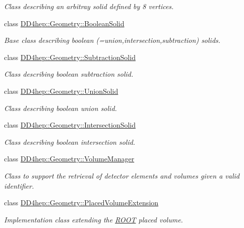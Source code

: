 \begin{DoxyCompactItemize}
\begin{DoxyCompactList}\small\item\em Class describing an arbitray solid defined by 8 vertices. \item\end{DoxyCompactList}\item 
class \hyperlink{class_d_d4hep_1_1_geometry_1_1_boolean_solid}{DD4hep::Geometry::BooleanSolid}
\begin{DoxyCompactList}\small\item\em Base class describing boolean (=union,intersection,subtraction) solids. \item\end{DoxyCompactList}\item 
class \hyperlink{class_d_d4hep_1_1_geometry_1_1_subtraction_solid}{DD4hep::Geometry::SubtractionSolid}
\begin{DoxyCompactList}\small\item\em Class describing boolean subtraction solid. \item\end{DoxyCompactList}\item 
class \hyperlink{class_d_d4hep_1_1_geometry_1_1_union_solid}{DD4hep::Geometry::UnionSolid}
\begin{DoxyCompactList}\small\item\em Class describing boolean union solid. \item\end{DoxyCompactList}\item 
class \hyperlink{class_d_d4hep_1_1_geometry_1_1_intersection_solid}{DD4hep::Geometry::IntersectionSolid}
\begin{DoxyCompactList}\small\item\em Class describing boolean intersection solid. \item\end{DoxyCompactList}\item 
class \hyperlink{class_d_d4hep_1_1_geometry_1_1_volume_manager}{DD4hep::Geometry::VolumeManager}
\begin{DoxyCompactList}\small\item\em Class to support the retrieval of detector elements and volumes given a valid identifier. \item\end{DoxyCompactList}\item 
class \hyperlink{class_d_d4hep_1_1_geometry_1_1_placed_volume_extension}{DD4hep::Geometry::PlacedVolumeExtension}
\begin{DoxyCompactList}\small\item\em Implementation class extending the \hyperlink{namespace_r_o_o_t}{ROOT} placed volume. \item\end{DoxyCompactList}\item 

\end{DoxyCompactItemize}
